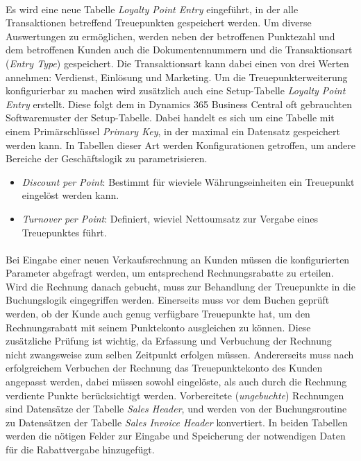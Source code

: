 \paragraph{}
Es wird eine neue Tabelle \textit{Loyalty Point Entry} eingeführt, in der alle Transaktionen betreffend Treuepunkten gespeichert werden. Um diverse Auswertungen zu ermöglichen, werden neben der betroffenen Punktezahl und dem betroffenen Kunden auch die Dokumentennummern und die Transaktionsart (\textit{Entry Type}) gespeichert. Die Transaktionsart kann dabei einen von drei Werten annehmen: Verdienst, Einlösung und Marketing. Um die Treuepunkterweiterung konfigurierbar zu machen wird zusätzlich auch eine Setup-Tabelle \textit{Loyalty Point Entry} erstellt. Diese folgt dem in Dynamics 365 Business Central oft gebrauchten Softwaremuster der Setup-Tabelle. Dabei handelt es sich um eine Tabelle mit einem Primärschlüssel \textit{Primary Key}, in der maximal ein Datensatz gespeichert werden kann. In Tabellen dieser Art werden Konfigurationen getroffen, um andere Bereiche der Geschäftslogik zu parametrisieren.

\begin{itemize}
	\item \textit{Discount per Point}: Bestimmt für wieviele Währungseinheiten ein Treuepunkt eingelöst werden kann.
	\item \textit{Turnover per Point}: Definiert, wieviel Nettoumsatz zur Vergabe eines Treuepunktes führt.
\end{itemize}

\paragraph{}
Bei Eingabe einer neuen Verkaufsrechnung an Kunden müssen die konfigurierten Parameter abgefragt werden, um entsprechend Rechnungsrabatte zu erteilen. Wird die Rechnung danach gebucht, muss zur Behandlung der Treuepunkte in die Buchungslogik eingegriffen werden. Einerseits muss vor dem Buchen geprüft werden, ob der Kunde auch genug verfügbare Treuepunkte hat, um den Rechnungsrabatt mit seinem Punktekonto ausgleichen zu können. Diese zusätzliche Prüfung ist wichtig, da Erfassung und Verbuchung der Rechnung nicht zwangsweise zum selben Zeitpunkt erfolgen müssen. Andererseits muss nach erfolgreichem Verbuchen der Rechnung das Treuepunktekonto des Kunden angepasst werden, dabei müssen sowohl eingelöste, als auch durch die Rechnung verdiente Punkte berücksichtigt werden. Vorbereitete (\textit{ungebuchte}) Rechnungen sind Datensätze der Tabelle \textit{Sales Header}, und werden von der Buchungsroutine zu Datensätzen der Tabelle \textit{Sales Invoice Header} konvertiert. In beiden Tabellen werden die nötigen Felder zur Eingabe und Speicherung der notwendigen Daten für die Rabattvergabe hinzugefügt.

